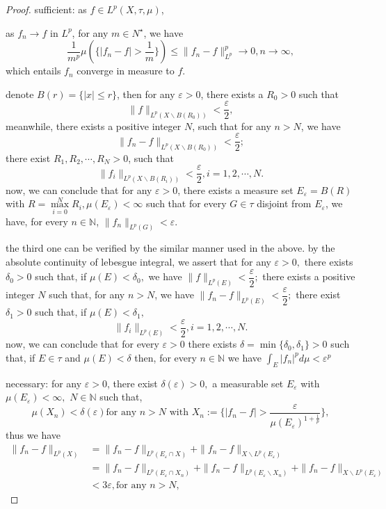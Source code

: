 \begin{proof}
	sufficient: as $ f\in L^p(X, \tau, \mu) $,
	
	as $ f_n \rightarrow f $ in $ L^p $, for any $ m\in N^\star $, we have $$\frac{1}{m^p} \mu(\{|f_n-f|>\frac{1}{m}\}) \leqslant \|f_n-f\|_{L^p}^p\rightarrow 0, n\rightarrow\infty,$$
	which entails $ f_n $ converge in measure to $ f $.
	
	denote $ B(r) = \{|x|\leqslant r\} $, then for any $ \varepsilon>0 $, there exists a $R_0>0$ such that \[ \|f\|_{L^p(X\backslash B(R_0))} < \frac{\varepsilon}{2},\]
	meanwhile, there exists a positive integer $ N $, such that for any $ n>N $, we have 
	\[ \|f_n-f\|_{L^p(X\backslash B(R_0))} < \frac{\varepsilon}{2};\]
	there exist $ R_1, R_2, \cdots, R_N > 0 $, such that 
	\[ \|f_i\|_{L^p(X\backslash B(R_i))} < \frac{\varepsilon}{2}, i = 1, 2, \cdots, N.\]
	now, we can conclude that for any $ \varepsilon>0 $, there exists a measure set $ E_\varepsilon = B(R)$ with $ R = \max\limits_{i=0}^N R_i,\mu(E_\varepsilon)<\infty $ such that for every $ G\in\tau $ disjoint from $ E_\varepsilon $, we have, for every $ n\in \mathbb{N} $, $ \|f_n\|_{L^p(G)}<\varepsilon $.
	
	the third one can be verified by the similar manner used in the above. by the absolute continuity of lebesgue integral, we assert that for any $ \varepsilon>0, $ there exists $ \delta_0>0 $ such that, if $ \mu(E)<\delta_0, $ we have $ \|f\|_{L^p(E)} < \dfrac\varepsilon2; $ there exists a positive integer $ N $ such that, for any $ n>N $, we have $ \|f_n-f\|_{L^p(E)} < \dfrac{\varepsilon}{2};$ there exist $ \delta_1 > 0  $ such that, if $ \mu(E)< \delta_1, $ 
	\[ \|f_i\|_{L^p(E)} < \frac{\varepsilon}{2}, i = 1, 2, \cdots, N.\]
	now, we can conclude that for  every $\varepsilon>0$ there exists $\delta=\min\{\delta_0, \delta_1\}>0$ such that, if $E \in \tau$ and $\mu(E)<\delta$ then, for every $n \in \mathbb{N}$ we have $\int_{E}\left|f_{n}\right|^{p} d \mu<\varepsilon^{p}$	
	
	necessary: for any $ \varepsilon>0 $, there exist $ \delta(\varepsilon)>0,$ a measurable set $ E_\varepsilon $ with $ \mu(E_\varepsilon)<\infty, $ $N\in\mathbb{N}$ such that, 
	\[ \mu(X_n) < \delta(\varepsilon) \text{for any } n > N \text{ with } X_n:=\{|f_n-f|>\dfrac{\varepsilon}{\mu(E_\varepsilon)^{1+\frac{1}{p}}}\},\]
	thus we have
	\begin{equation*}
		\begin{split}
			\|f_n-f\|_{L^p(X)} &= \|f_n-f\|_{L^p(E_\varepsilon\cap X)} + \|f_n-f\|_{X\backslash L^p(E_\varepsilon)}\\
			&= \|f_n-f\|_{L^p(E_\varepsilon\cap X_n)} + \|f_n-f\|_{L^p(E_\varepsilon\backslash X_n)} +
			\|f_n-f\|_{X\backslash L^p(E_\varepsilon)}\\
			&< 3\varepsilon, \text{for any } n>N,
		\end{split}
	\end{equation*}
\end{proof}

